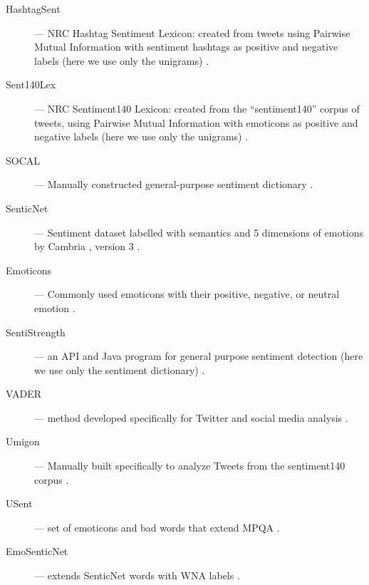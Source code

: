 \begin{description}
    \item[HashtagSent] --- NRC Hashtag Sentiment Lexicon: created from tweets using Pairwise Mutual Information with sentiment hashtags as positive and negative labels (here we use only the unigrams) \cite{zhu2014nrc}.
    \item[Sent140Lex] --- NRC Sentiment140 Lexicon: created from the ``sentiment140'' corpus of tweets, using Pairwise Mutual Information with emoticons as positive and negative labels (here we use only the unigrams) \cite{MohammadKZ2013}.
    \item[SOCAL] --- Manually constructed general-purpose sentiment dictionary \cite{taboada2011lexicon}.
    \item[SenticNet] --- Sentiment dataset labelled with semantics and 5 dimensions of emotions by Cambria \etal, version 3 \cite{cambria2014senticnet}.
    \item[Emoticons] --- Commonly used emoticons with their positive, negative, or neutral emotion \cite{gonccalves2013comparing}.
    \item[SentiStrength] --- an API and Java program for general purpose sentiment detection (here we use only the sentiment dictionary) \cite{thelwall2010sentiment}.
    \item[VADER] --- method developed specifically for Twitter and social media analysis \cite{hutto2014vader}.
    \item[Umigon] --- Manually built specifically to analyze Tweets from the sentiment140 corpus \cite{levallois2013umigon}.
    \item[USent] --- set of emoticons and bad words that extend MPQA \cite{pappas2013distinguishing}.
    \item[EmoSenticNet] --- extends SenticNet words with WNA labels \cite{poria2013enhanced}.
  \end{description}

